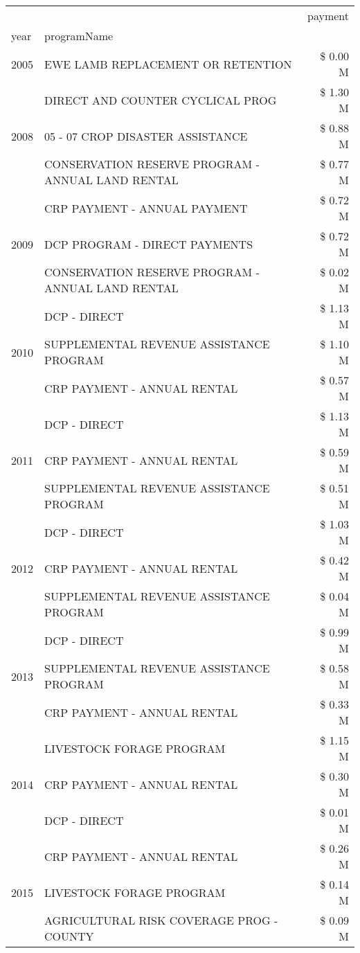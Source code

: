\begin{tabular}{llr}
\toprule
 &  & payment \\
year & programName &  \\
\midrule
2005 & EWE LAMB REPLACEMENT OR RETENTION & \$ 0.00 M \\
\cline{1-3}
\multirow[t]{3}{*}{2008} & DIRECT AND COUNTER CYCLICAL PROG & \$ 1.30 M \\
 & 05 - 07 CROP DISASTER ASSISTANCE & \$ 0.88 M \\
 & CONSERVATION RESERVE PROGRAM - ANNUAL LAND RENTAL & \$ 0.77 M \\
\cline{1-3}
\multirow[t]{3}{*}{2009} & CRP PAYMENT - ANNUAL PAYMENT & \$ 0.72 M \\
 & DCP PROGRAM - DIRECT PAYMENTS & \$ 0.72 M \\
 & CONSERVATION RESERVE PROGRAM - ANNUAL LAND RENTAL & \$ 0.02 M \\
\cline{1-3}
\multirow[t]{3}{*}{2010} & DCP - DIRECT & \$ 1.13 M \\
 & SUPPLEMENTAL REVENUE ASSISTANCE PROGRAM & \$ 1.10 M \\
 & CRP PAYMENT - ANNUAL RENTAL & \$ 0.57 M \\
\cline{1-3}
\multirow[t]{3}{*}{2011} & DCP - DIRECT & \$ 1.13 M \\
 & CRP PAYMENT - ANNUAL RENTAL & \$ 0.59 M \\
 & SUPPLEMENTAL REVENUE ASSISTANCE PROGRAM & \$ 0.51 M \\
\cline{1-3}
\multirow[t]{3}{*}{2012} & DCP - DIRECT & \$ 1.03 M \\
 & CRP PAYMENT - ANNUAL RENTAL & \$ 0.42 M \\
 & SUPPLEMENTAL REVENUE ASSISTANCE PROGRAM & \$ 0.04 M \\
\cline{1-3}
\multirow[t]{3}{*}{2013} & DCP - DIRECT & \$ 0.99 M \\
 & SUPPLEMENTAL REVENUE ASSISTANCE PROGRAM & \$ 0.58 M \\
 & CRP PAYMENT - ANNUAL RENTAL & \$ 0.33 M \\
\cline{1-3}
\multirow[t]{3}{*}{2014} & LIVESTOCK FORAGE PROGRAM & \$ 1.15 M \\
 & CRP PAYMENT - ANNUAL RENTAL & \$ 0.30 M \\
 & DCP - DIRECT & \$ 0.01 M \\
\cline{1-3}
\multirow[t]{3}{*}{2015} & CRP PAYMENT - ANNUAL RENTAL & \$ 0.26 M \\
 & LIVESTOCK FORAGE PROGRAM & \$ 0.14 M \\
 & AGRICULTURAL RISK COVERAGE PROG - COUNTY & \$ 0.09 M \\

\end{tabular}
